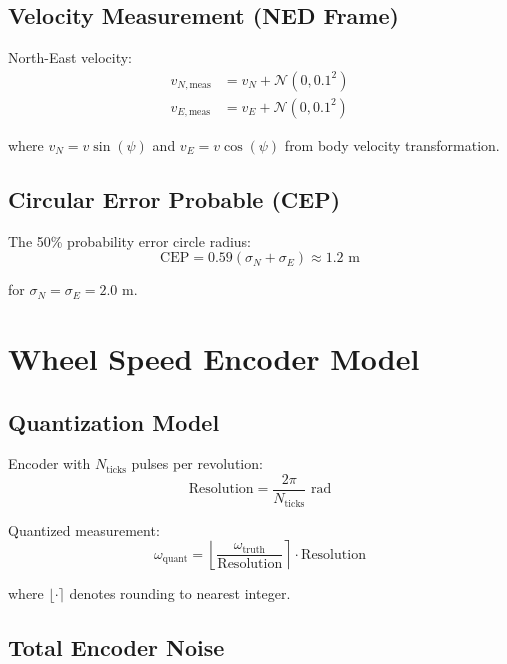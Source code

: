 \documentclass[11pt,a4paper]{article}
\begin{document}
\subsection{Velocity Measurement (NED Frame)}

North-East velocity:
\begin{align}
v_{N,\text{meas}} &= v_N + \mathcal{N}(0, 0.1^2) \\
v_{E,\text{meas}} &= v_E + \mathcal{N}(0, 0.1^2)
\end{align}

where $v_N = v \sin(\psi)$ and $v_E = v \cos(\psi)$ from body velocity transformation.

\subsection{Circular Error Probable (CEP)}

The 50\% probability error circle radius:
\begin{equation}
\text{CEP} = 0.59(\sigma_N + \sigma_E) \approx 1.2 \text{ m}
\end{equation}

for $\sigma_N = \sigma_E = 2.0$ m.

\section{Wheel Speed Encoder Model}

\subsection{Quantization Model}

Encoder with $N_{\text{ticks}}$ pulses per revolution:
\begin{equation}
\text{Resolution} = \frac{2\pi}{N_{\text{ticks}}} \text{ rad}
\end{equation}

Quantized measurement:
\begin{equation}
\omega_{\text{quant}} = \left\lfloor \frac{\omega_{\text{truth}}}{\text{Resolution}} \right\rceil \cdot \text{Resolution}
\end{equation}

where $\lfloor \cdot \rceil$ denotes rounding to nearest integer.

\subsection{Total Encoder Noise}
\end{document}
